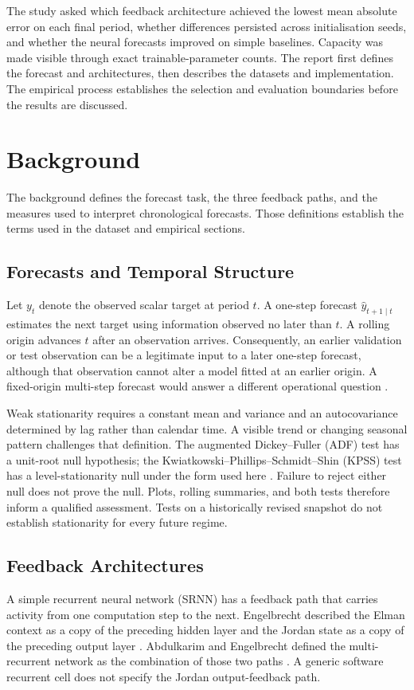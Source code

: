 \documentclass[conference,10pt]{IEEEtran}
\begin{document}
The study asked which feedback architecture achieved the lowest mean absolute error on each final period, whether differences persisted across initialisation seeds, and whether the neural forecasts improved on simple baselines. Capacity was made visible through exact trainable-parameter counts. The report first defines the forecast and architectures, then describes the datasets and implementation. The empirical process establishes the selection and evaluation boundaries before the results are discussed.

\section{Background}
The background defines the forecast task, the three feedback paths, and the measures used to interpret chronological forecasts. Those definitions establish the terms used in the dataset and empirical sections.

\subsection{Forecasts and Temporal Structure}
Let $y_t$ denote the observed scalar target at period $t$. A one-step forecast $\hat y_{t+1\mid t}$ estimates the next target using information observed no later than $t$. A rolling origin advances $t$ after an observation arrives. Consequently, an earlier validation or test observation can be a legitimate input to a later one-step forecast, although that observation cannot alter a model fitted at an earlier origin. A fixed-origin multi-step forecast would answer a different operational question \cite{tashman2000outofsample}.

Weak stationarity requires a constant mean and variance and an autocovariance determined by lag rather than calendar time. A visible trend or changing seasonal pattern challenges that definition. The augmented Dickey--Fuller (ADF) test has a unit-root null hypothesis; the Kwiatkowski--Phillips--Schmidt--Shin (KPSS) test has a level-stationarity null under the form used here \cite{dickey1979unitroot,kwiatkowski1992stationarity}. Failure to reject either null does not prove the null. Plots, rolling summaries, and both tests therefore inform a qualified assessment. Tests on a historically revised snapshot do not establish stationarity for every future regime.

\subsection{Feedback Architectures}
A simple recurrent neural network (SRNN) has a feedback path that carries activity from one computation step to the next. Engelbrecht described the Elman context as a copy of the preceding hidden layer and the Jordan state as a copy of the preceding output layer \cite{engelbrecht2007computational}. Abdulkarim and Engelbrecht defined the multi-recurrent network as the combination of those two paths \cite{abdulkarim2019recurrent}. A generic software recurrent cell does not specify the Jordan output-feedback path.
\end{document}
